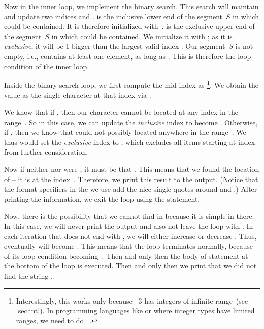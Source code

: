 Now in the inner loop, we implement the binary search.
This search will maintain and update two indices  and .
 is the inclusive lower end of the segment~$S$ in which  could be contained.
It is therefore initialized with~.
 is the exclusive upper end of the segment~$S$ in which  could be contained.
We initialize it with ; as it is \emph{exclusive}, it will be 1 bigger than the largest valid index .
Our segment~$S$ is not empty, i.e., contains at least one element, as long as .
This is therefore the loop condition of the inner loop.

Inside the binary search loop, we first compute the mid index as \footnote{%
Interestingly, this works only because \python~3 has integers of infinite range~(see \cref{sec:int}). %
In programming languages like  or  where integer types have limited ranges, we need to do ~\cite{H2024POIC:BS}.%
}.
We obtain the value  as the single character at that index via .

We know that if , then our character  cannot be located at any index in the range~.
So in this case, we can update the \emph{inclusive} index  to become .
Otherwise, if , then we know that  could not possibly located anywhere in the range~.
We thus would set the \emph{exclusive} index  to , which excludes all items starting at index  from further consideration.%
%
\begin{sloppypar}%
Now if neither  nor  were , it must be that .
This means that we found the location of  -- it is at the index~.
Therefore, we print this result to the output.
(Notice that the  format specifiers in the  we use add the nice single quotes around  and .)
After printing the information, we exit the  loop using the  statement.%
\end{sloppypar}%
%
Now, there is the possibility that we cannot find  in  because it is simple in there.
In this case, we will never print the output and also not leave the loop with .
In each iteration that does not end with , we will either increase  or decrease .
Thus, eventually  will become .
This means that the loop terminates normally, because of its loop condition becoming~.
Then and only then the body of  statement at the bottom of the loop is executed.
Then and only then we print that we did not find the string .

